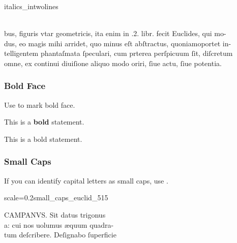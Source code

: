 \begin{sampleImage}{italics_intwolines}
\begin{typeLatin}
 \someText\\
bus, figuris vtar geometricis, ita enim in .2. libr. fecit Euclides, qui mo- \\
dus, eo magis mihi arridet, quo minus eſt abſtractus, quoniam\lwr oportet in- \\
telligentem phantaſmata ſpeculari, cum prterea perſpicuum ſit, diſcretum \\
omne, ex continui diuiſione aliquo modo oriri, ſiue actu, ſiue potentia. \\
\someText {}
\end{typeLatin}
\end{sampleImage}


\subsubsection{Bold Face}
\label{section bold face}

\begin{mainruleLessImportant}
Use  to mark bold face.
\end{mainruleLessImportant}

\begin{example}

\vspace{-4mm}
This is a \textbf{bold}  statement.

\begin{typeLatin}
This is a bold statement.
\end{typeLatin}
\end{example}

\subsubsection{Small Caps}
\label{section small caps}

\begin{mainrule}
If you can identify capital letters as small caps, use .
\end{mainrule}

\vspace{3mm}
\begin{sampleImageSmall}{scale=0.2}{small_caps_euclid_515}

\begin{typeLatin}
CAMPANVS. Sit datus trigonus \\
a: cui nos uolumus æquum quadra- \\
tum deſcribere. Deſignabo ſuperfici\bs\tld{}e  \\
\someText {}
\end{typeLatin}

\end{sampleImageSmall}

